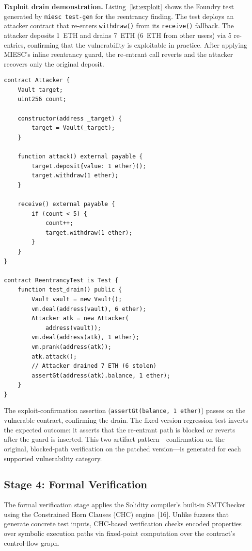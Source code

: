 \documentclass[conference]{IEEEtran}
\begin{document}
\textbf{Exploit drain demonstration.} Listing~\ref{lst:exploit} shows the Foundry test generated by \texttt{miesc test-gen} for the reentrancy finding. The test deploys an attacker contract that re-enters \texttt{withdraw()} from its \texttt{receive()} fallback. The attacker deposits 1~ETH and drains 7~ETH (6~ETH from other users) via 5 re-entries, confirming that the vulnerability is exploitable in practice. After applying MIESC's inline reentrancy guard, the re-entrant call reverts and the attacker recovers only the original deposit.

\begin{lstlisting}[caption={Generated exploit test for reentrancy (simplified)},label={lst:exploit},float=htbp]
contract Attacker {
    Vault target;
    uint256 count;

    constructor(address _target) {
        target = Vault(_target);
    }

    function attack() external payable {
        target.deposit{value: 1 ether}();
        target.withdraw(1 ether);
    }

    receive() external payable {
        if (count < 5) {
            count++;
            target.withdraw(1 ether);
        }
    }
}

contract ReentrancyTest is Test {
    function test_drain() public {
        Vault vault = new Vault();
        vm.deal(address(vault), 6 ether);
        Attacker atk = new Attacker(
            address(vault));
        vm.deal(address(atk), 1 ether);
        vm.prank(address(atk));
        atk.attack();
        // Attacker drained 7 ETH (6 stolen)
        assertGt(address(atk).balance, 1 ether);
    }
}
\end{lstlisting}

The exploit-confirmation assertion (\texttt{assertGt(balance, 1 ether)}) passes on the vulnerable contract, confirming the drain. The fixed-version regression test inverts the expected outcome: it asserts that the re-entrant path is blocked or reverts after the guard is inserted. This two-artifact pattern---confirmation on the original, blocked-path verification on the patched version---is generated for each supported vulnerability category.

\subsection{Stage 4: Formal Verification}

The formal verification stage applies the Solidity compiler's built-in SMTChecker using the Constrained Horn Clauses (CHC) engine~[16]. Unlike fuzzers that generate concrete test inputs, CHC-based verification checks encoded properties over symbolic execution paths via fixed-point computation over the contract's control-flow graph.
\end{document}
